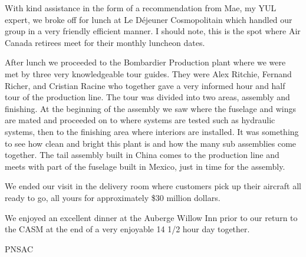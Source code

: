 With kind assistance in the form of a recommendation from Mae, my YUL
expert, we broke off for lunch at Le D\'{e}jeuner Cosmopolitain which
handled our group in a very friendly efficient manner. I should note,
this is the spot where Air Canada retirees meet for their monthly
luncheon dates.

After lunch we proceeded to the Bombardier Production plant where we
were met by three very knowledgeable tour guides. They were Alex
Ritchie, Fernand Richer, and Cristian Racine who together gave a very
informed hour and half tour of the production line. The tour was
divided into two areas, assembly and finishing. At the beginning of
the assembly we saw where the fuselage and wings are mated and
proceeded on to where systems are tested such as hydraulic systems,
then to the finishing area where interiors are installed. It was
something to see how clean and bright this plant is and how the many
sub assemblies come together. The tail assembly built in China comes
to the production line and meets with part of the fuselage built in
Mexico, just in time for the assembly.

We ended our visit in the delivery room where customers pick up their
aircraft all ready to go, all yours for approximately \$30 million
dollars.

We enjoyed an excellent dinner at the Auberge Willow Inn prior to our
return to the CASM at the end of a very enjoyable 14 1/2 hour day
together.

\begin{footnotesize}
    \raggedleft PNSAC\\
\end{footnotesize}

